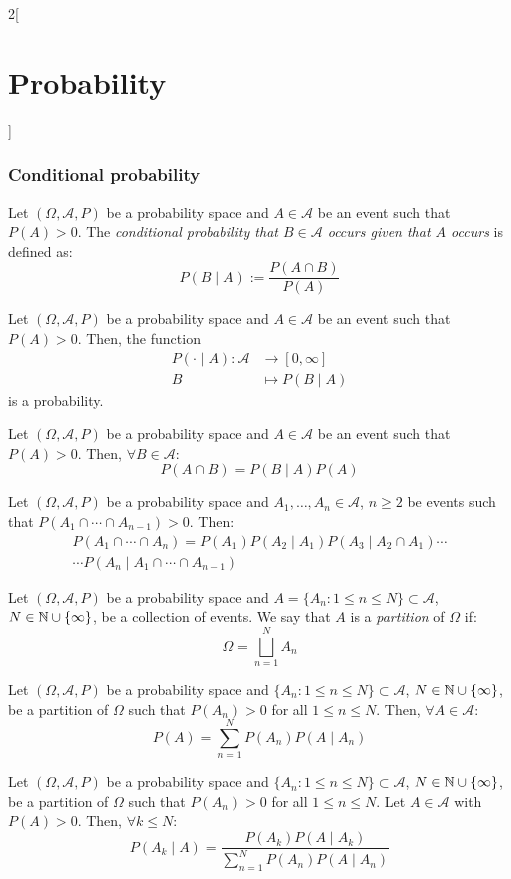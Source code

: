 \documentclass[../../../main.tex]{subfiles}
\begin{document}
\begin{multicols}{2}[\section{Probability}]
  \subsubsection*{Conditional probability}
  \begin{definition}
    Let $(\Omega,\mathcal{A},P)$ be a probability space and $A\in\mathcal{A}$ be an event such that $P(A)>0$. The \textit{conditional probability that $B\in\mathcal{A}$ occurs given that $A$ occurs} is defined as: $$P(B\mid A):=\frac{P(A\cap B)}{P(A)}$$
  \end{definition}
  \begin{prop}
    Let $(\Omega,\mathcal{A},P)$ be a probability space and $A\in\mathcal{A}$ be an event such that $P(A)>0$. Then, the function
    \begin{align*}
      P(\cdot\mid A):\mathcal{A} & \longrightarrow [0,\infty] \\
      B                          & \longmapsto P(B\mid A)
    \end{align*}
    is a probability.
  \end{prop}
  \begin{prop}
    Let $(\Omega,\mathcal{A},P)$ be a probability space and $A\in\mathcal{A}$ be an event such that $P(A)>0$. Then, $\forall B\in\mathcal{A}$: $$P(A\cap B)=P(B\mid A)P(A)$$
  \end{prop}
  \begin{prop}
    Let $(\Omega,\mathcal{A},P)$ be a probability space and $A_1,\ldots,A_n\in\mathcal{A}$, $n\geq 2$ be events such that $P(A_1\cap\cdots\cap A_{n-1})>0$. Then:
    \begin{multline*}
      P(A_1\cap\cdots\cap A_n)=P(A_1)P(A_2\mid A_1)P(A_3\mid A_2\cap A_1)\cdots\\\cdots P(A_n\mid A_1\cap\cdots\cap A_{n-1})
    \end{multline*}
  \end{prop}
  \begin{definition}
    Let $(\Omega,\mathcal{A},P)$ be a probability space and $A=\{A_n:1\leq n\leq N\}\subset\mathcal{A}$, $N\in\mathbb{N}\cup\{\infty\}$, be a collection of events. We say that $A$ is a \textit{partition} of $\Omega$ if: $$\Omega=\bigsqcup_{n=1}^NA_n$$
  \end{definition}
  \begin{prop}
    Let $(\Omega,\mathcal{A},P)$ be a probability space and $\{A_n:1\leq n\leq N\}\subset\mathcal{A}$, $N\in\mathbb{N}\cup\{\infty\}$, be a partition of $\Omega$ such that $P(A_n)>0$ for all $1\leq n\leq N$. Then, $\forall A\in\mathcal{A}$: $$P(A)=\sum_{n=1}^NP(A_n)P(A\mid A_n)$$
  \end{prop}
  \begin{prop}
    Let $(\Omega,\mathcal{A},P)$ be a probability space and $\{A_n:1\leq n\leq N\}\subset\mathcal{A}$, $N\in\mathbb{N}\cup\{\infty\}$, be a partition of $\Omega$ such that $P(A_n)>0$ for all $1\leq n\leq N$. Let $A\in\mathcal{A}$ with $P(A)>0$. Then, $\forall k\leq N$: $$P(A_k\mid A)=\frac{P(A_k)P(A\mid A_k)}{\sum_{n=1}^NP(A_n)P(A\mid A_n)}$$
  \end{prop}

\end{multicols}
\end{document}
